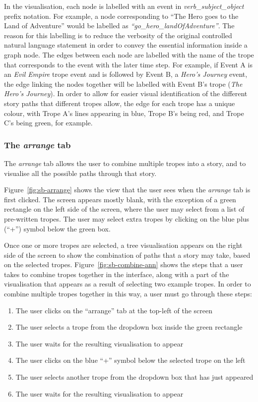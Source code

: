 \documentclass[11pt]{report}
\begin{document}
In the visualisation, each node is labelled with an event in
\emph{verb_subject_object} prefix notation. For example, a node corresponding to
``The Hero goes to the Land of Adventure'' would be labelled as
\emph{``go_hero_landOfAdventure''}. The reason for this labelling is to reduce
the verbosity of the original controlled natural language statement in order to
convey the essential information inside a graph node. The edges between
each node are labelled with the name of the trope that corresponds to the event with the
later time step. For example, if
Event A is an \emph{Evil Empire} trope event and is followed by Event B, a
\emph{Hero's Journey} event, the edge linking the nodes together will be
labelled with Event B's trope (\emph{The Hero's Journey}). In order to allow for
easier visual identification of the different story paths that different tropes
allow, the edge for each trope has a unique colour, with Trope A's lines
appearing in blue, Trope B's being red, and Trope C's being green, for example.

\subsubsection{The \emph{arrange} tab}

The \emph{arrange} tab allows the user to combine multiple tropes into a story,
and to visualise all the possible paths through that story.

Figure~\ref{fig:sb-arrange} shows the view that the user sees when the
\emph{arrange} tab is first clicked. The screen appears mostly blank, with the
exception of a green rectangle on the left side of the screen, where the user
may select from a list of pre-written tropes. The user may select extra tropes
by clicking on the blue plus (``+'') symbol below the green box.

Once one or more tropes are selected, a tree visualisation appears on the right
side of the screen to show the combination of paths that a story may take, based
on the selected tropes. Figure~\ref{fig:sb-combine-ann} shows the steps that a
user takes to combine tropes together in the interface, along with a part of the
visualisation that appears as a result of selecting two example tropes. In order
to combine multiple tropes together in this way, a user must go through these steps:

\begin{enumerate}
  \item The user clicks on the ``arrange'' tab at the top-left of the screen
  \item The user selects a trope from the dropdown box inside the green rectangle
  \item The user waits for the resulting visualisation to appear
  \item The user clicks on the blue ``+'' symbol below the selected trope on the left
  \item The user selects another trope from the dropdown box that has just appeared
  \item The user waits for the resulting visualisation to appear
\end{enumerate}
\end{document}
